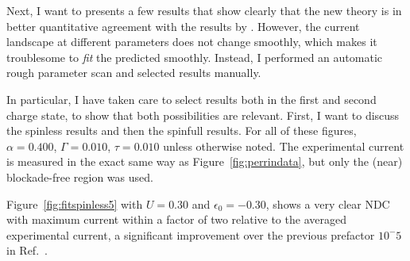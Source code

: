 Next, I want to presents a few results that show clearly that the new theory is in better quantitative agreement with the results by \citet{perrinnano}. However, the current landscape at different parameters does not change smoothly, which makes it troublesome to \emph{fit} the predicted smoothly. Instead, I performed an automatic rough parameter scan and selected results manually.

In particular, I have taken care to select results both in the first and second charge state, to show that both possibilities are relevant. First, I want to discuss the spinless results and then the spinfull results. For all of these figures, $\alpha=0.400$, $\Gamma=0.010$, $\tau=0.010$ unless otherwise noted. The experimental current is measured in the exact same way as Figure~\ref{fig:perrindata}, but only the (near) blockade-free region was used.

Figure~\ref{fig:fitspinless5} with $U=0.30$ and $\epsilon_0=-0.30$, shows a very clear NDC with maximum current within a factor of two relative to the averaged experimental current, a significant improvement over the previous prefactor $10^-5$ in Ref.~\cite{perrinnano}.


